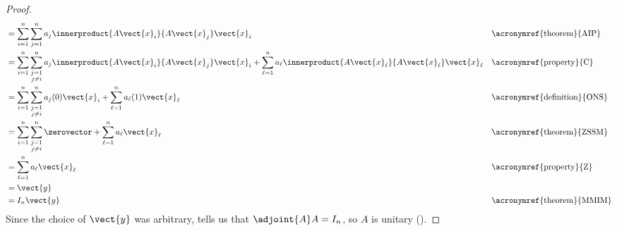\begin{proof}
\begin{align*}
%
&=\sum_{i=1}^{n}\sum_{j=1}^{n}a_j\innerproduct{A\vect{x}_i}{A\vect{x}_j}\vect{x}_i
&&\text{\acronymref{theorem}{AIP}}\\
%
&=
\sum_{i=1}^{n}\sum_{\substack{j=1\\j\neq i}}^{n}a_j\innerproduct{A\vect{x}_i}{A\vect{x}_j}\vect{x}_i
+
\sum_{\ell=1}^{n}a_\ell\innerproduct{A\vect{x}_\ell}{A\vect{x}_\ell}\vect{x}_\ell
&&\text{\acronymref{property}{C}}\\
%
&=
\sum_{i=1}^{n}\sum_{\substack{j=1\\j\neq i}}^{n}a_j(0)\vect{x}_i
+
\sum_{\ell=1}^{n}a_\ell(1)\vect{x}_\ell
&&\text{\acronymref{definition}{ONS}}\\
%
&=
\sum_{i=1}^{n}\sum_{\substack{j=1\\j\neq i}}^{n}\zerovector
+
\sum_{\ell=1}^{n}a_\ell\vect{x}_\ell
&&\text{\acronymref{theorem}{ZSSM}}\\
%
&=\sum_{\ell=1}^{n}a_\ell\vect{x}_\ell
&&\text{\acronymref{property}{Z}}\\
%
&=\vect{y}\\
%
&=I_n\vect{y}
&&\text{\acronymref{theorem}{MMIM}}
%
\end{align*}
%
Since the choice of $\vect{y}$ was arbitrary,  tells us that $\adjoint{A}A=I_n$, so $A$ is unitary ().
%
\end{proof}
%
